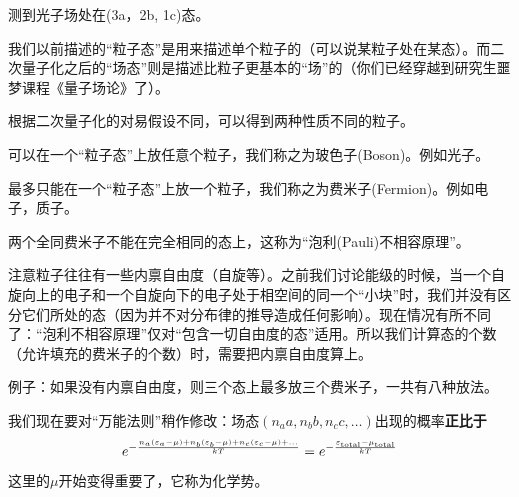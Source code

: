 \documentclass[CJK]{beamer}
\begin{document}
\begin{frame}
\bch
{}
\emini
{}
测到光子场处在(3a，2b, 1c)态。

\skiplines

我们以前描述的“粒子态”是用来描述单个粒子的（可以说某粒子处在某态）。而二次量子化之后的“场态”则是描述比粒子更基本的“场”的（\bye 你们已经穿越到研究生噩梦课程《量子场论》了）。

\emini

\ech
\end{frame}


\begin{frame}
\bch

根据二次量子化的对易假设不同，可以得到两种性质不同的粒子。

\bitem
\item{可以在一个“粒子态”上放任意个粒子，我们称之为{\blue 玻色子(Boson)}。例如光子。}
\item{最多只能在一个“粒子态”上放一个粒子，我们称之为{\blue 费米子(Fermion)}。例如电子，质子。}
\eitem

{\blue 两个全同费米子不能在完全相同的态上}，这称为“{\blue 泡利(Pauli)不相容原理}”。

{\small
注意粒子往往有一些内禀自由度（自旋等）。之前我们讨论能级的时候，当一个自旋向上的电子和一个自旋向下的电子处于相空间的同一个“小块”时，我们并没有区分它们所处的态（因为并不对分布律的推导造成任何影响）。现在情况有所不同了：{\blue “泡利不相容原理”仅对“包含一切自由度的态”适用}。所以我们{\blue 计算态的个数（允许填充的费米子的个数）时，需要把内禀自由度算上}。}
\ech
\end{frame}


\begin{frame}
\bch
例子：如果没有内禀自由度，则三个态上最多放三个费米子，一共有八种放法。

\ech
\end{frame}


\begin{frame}
\bch
我们现在要对“万能法则”稍作修改：场态$(n_a a, n_bb, n_c c,\ldots)$出现的概率{\bf 正比于}
$$e^{-\frac{n_a(\varepsilon_a-\mu)+n_b(\varepsilon_b-\mu)+n_c(\varepsilon_c-\mu)+\ldots}{kT}} = e^{-\frac{\varepsilon_{\rm total} - \mu_{\rm total}}{kT}}$$

\skiplines

这里的$\mu$开始变得重要了，它称为化学势。

\ech
\end{frame}
\end{document}
